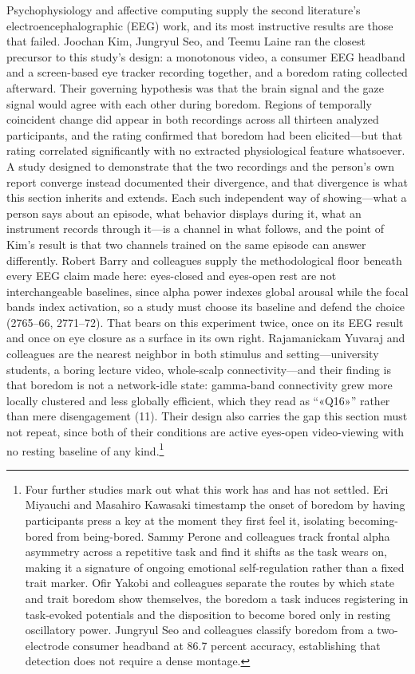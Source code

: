 Psychophysiology and affective computing supply the second literature's electroencephalographic
(EEG) work, and its most instructive results are those that failed. Joochan Kim, Jungryul Seo,
and Teemu Laine ran the closest precursor to this study's design: a monotonous video, a
consumer EEG headband and a screen-based eye tracker recording together, and a boredom rating
collected afterward. Their governing hypothesis was that the brain signal and the gaze signal
would agree with each other during boredom. Regions of temporally coincident change did appear
in both recordings across all thirteen analyzed participants, and the rating confirmed that
boredom had been elicited---but that rating correlated significantly with no extracted
physiological feature whatsoever. A study designed to demonstrate that the two recordings and the
person's own report converge instead documented their divergence, and that divergence is what
this section inherits and extends. Each such independent way of showing---what a person says
about an episode, what behavior displays during it, what an instrument records through it---is
a channel in what follows, and the point of Kim's result is that two channels trained on the
same episode can answer differently. Robert Barry and colleagues supply the methodological
floor beneath every EEG claim made here: eyes-closed and eyes-open rest are not interchangeable
baselines, since alpha power indexes global arousal while the focal bands index activation, so
a study must choose its baseline and defend the choice (2765--66, 2771--72). That bears on
this experiment twice, once on its EEG result and once on eye closure as a surface in its own
right. Rajamanickam Yuvaraj and colleagues are the nearest neighbor in both stimulus and
setting---university students, a boring lecture video, whole-scalp connectivity---and their
finding is that boredom is not a network-idle state: gamma-band connectivity grew more locally
clustered and less globally efficient, which they read as ``«Q16»'' rather than mere
disengagement (11). Their design also carries the gap this section must not repeat, since both
of their conditions are active eyes-open video-viewing with no resting baseline of any
kind.\footnote{Four further studies mark out what this work has and has not settled. Eri
Miyauchi and Masahiro Kawasaki timestamp the onset of boredom by having participants press a
key at the moment they first feel it, isolating becoming-bored from being-bored. Sammy Perone
and colleagues track frontal alpha asymmetry across a repetitive task and find it shifts as
the task wears on, making it a signature of ongoing emotional self-regulation rather than a
fixed trait marker. Ofir Yakobi and colleagues separate the routes by which state and trait
boredom show themselves, the boredom a task induces registering in task-evoked potentials and
the disposition to become bored only in resting oscillatory power. Jungryul Seo and colleagues classify boredom from a
two-electrode consumer headband at 86.7 percent accuracy, establishing that detection does not
require a dense montage.}

